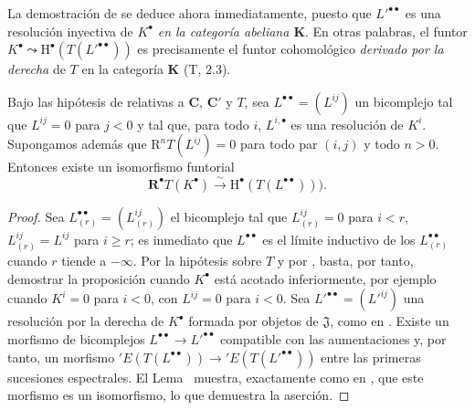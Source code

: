 \begin{env}[11.5.2.5]
\label{0.11.5.2.5}
\label{0.11.5.2.5-fr}
La demostración de  se deduce ahora inmediatamente, puesto que $L'^{\bullet\bullet}$ es una resolución inyectiva de $K^\bullet$ \emph{en la categoría abeliana $\boldsymbol{K}$}.
En otras palabras, el funtor
$K^\bullet\leadsto\mathrm H^\bullet(T(L'^{\bullet\bullet}))$
es precisamente el funtor cohomológico \emph{derivado por la derecha} de $T$ en la categoría $\boldsymbol{K}$ (T, 2.3).
\end{env}

\begin{proposition}[11.5.3]
\label{0.11.5.3}
\label{0.11.5.3-fr}
Bajo las hipótesis de  relativas a $\boldsymbol{C}$, $\boldsymbol{C}'$ y $T$, sea $L^{\bullet\bullet}=(L^{ij})$ un bicomplejo tal que $L^{ij}=0$ para $j<0$ y tal que, para todo $i$, $L^{i,\bullet}$ es una resolución de $K^i$.
Supongamos además que $\mathrm R^nT(L^{ij})=0$ para todo par $(i,j)$ y todo $n>0$.
Entonces existe un isomorfismo funtorial
\[
  \label{0.11.5.3.1-fr}
  \mathbf R^\bullet T(K^\bullet)\xrightarrow{\sim}
  \mathrm H^\bullet(T(L^{\bullet\bullet}))).
  \tag{11.5.3.1}
\]
\end{proposition}

\begin{proof}
Sea $L_{(r)}^{\bullet\bullet}=(L_{(r)}^{ij})$ el bicomplejo tal que $L_{(r)}^{ij}=0$ para $i<r$, $L_{(r)}^{ij}=L^{ij}$ para $i\geq r$; es inmediato que $L^{\bullet\bullet}$ es el límite inductivo de los $L_{(r)}^{\bullet\bullet}$ cuando $r$ tiende a $-\infty$.
Por la hipótesis sobre $T$ y por , basta, por tanto, demostrar la proposición cuando $K^\bullet$ está acotado inferiormente, por ejemplo cuando $K^i=0$ para $i<0$, con $L^{ij}=0$ para $i<0$.
Sea $L'^{\bullet\bullet}=(L'^{ij})$ una resolución por la derecha de $K^\bullet$ formada por objetos de $\mathfrak J$, como en .
Existe un morfismo de bicomplejos
$L^{\bullet\bullet}\to L'^{\bullet\bullet}$
compatible con las aumentaciones y, por tanto, un morfismo
$'E(T(L^{\bullet\bullet}))\to{}'E(T(L'^{\bullet\bullet}))$
entre las primeras sucesiones espectrales.
El Lema~ muestra, exactamente como en , que este morfismo es un isomorfismo, lo que demuestra la aserción.
\end{proof}

